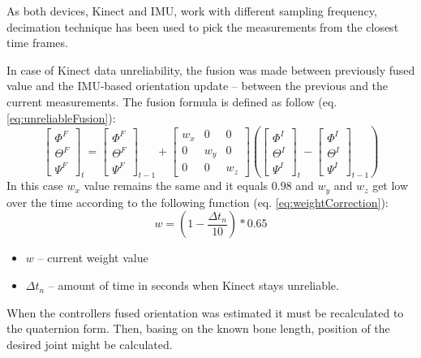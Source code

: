 \documentclass[9pt]{llncs}
\begin{document}
As both devices, Kinect and IMU, work with different sampling frequency, decimation technique has been used to pick the measurements from the closest time frames.

In case of Kinect data unreliability, the fusion was made between previously fused value and the IMU-based orientation update -- between the previous and the current measurements. The fusion formula is defined as follow (eq. \ref{eq:unreliableFusion}):
\begin{equation}
	\label{eq:unreliableFusion}
	\begin{bmatrix}  \Phi^F \\  \Theta^F \\  \Psi^F \end{bmatrix}_t = 
	\begin{bmatrix}  \Phi^F \\  \Theta^F \\  \Psi^F \end{bmatrix}_{t-1} + 
	\begin{bmatrix}  w_x&0&0 \\  0&w_y&0 \\  0&0&w_z \end{bmatrix}
	(\begin{bmatrix}  \Phi^I \\  \Theta^I \\  \Psi^I \end{bmatrix}_t -
	\begin{bmatrix}  \Phi^I \\  \Theta^I \\  \Psi^I \end{bmatrix}_{t-1})
\end{equation}
In this case $w_x$ value remains the same and it equals $0.98$ and $w_y$ and $w_z$ get low over the time according to the following function (eq. \ref{eq:weightCorrection}):
\begin{equation}
	\label{eq:weightCorrection}
	w = (1-\frac{\Delta t_n}{10}) * 0.65
\end{equation}
\begin{itemize}
	\item $w$ -- current weight value
	\item $\Delta t_n$ -- amount of time in seconds when Kinect stays unreliable.
\end{itemize}

When the controllers fused orientation was estimated it must be recalculated to the quaternion form. Then, basing on the known bone length, position of the desired joint might be calculated.
\end{document}
